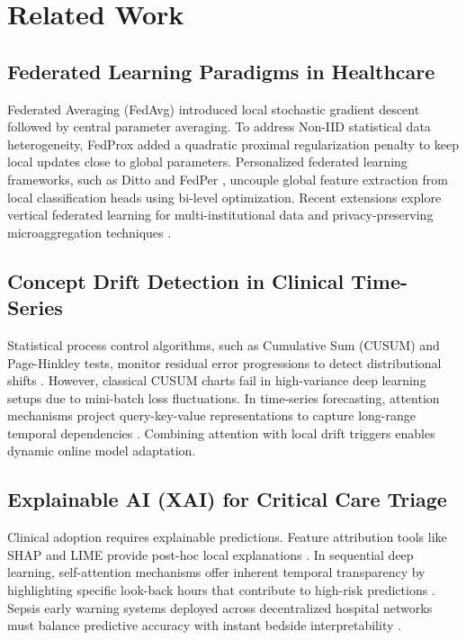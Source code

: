 \documentclass[conference]{IEEEtran}
\begin{document}
\section{Related Work}
\subsection{Federated Learning Paradigms in Healthcare}
Federated Averaging (FedAvg) \cite{mcmahan2017} introduced local stochastic gradient descent followed by central parameter averaging. To address Non-IID statistical data heterogeneity, FedProx \cite{li2020fedprox} added a quadratic proximal regularization penalty to keep local updates close to global parameters. Personalized federated learning frameworks, such as Ditto \cite{li2021ditto} and FedPer \cite{arivazhagan2020}, uncouple global feature extraction from local classification heads using bi-level optimization. Recent extensions explore vertical federated learning for multi-institutional data \cite{yang2025mvfl} and privacy-preserving microaggregation techniques \cite{gupta2025privacy, maurya2025secure}.

\subsection{Concept Drift Detection in Clinical Time-Series}
Statistical process control algorithms, such as Cumulative Sum (CUSUM) and Page-Hinkley tests, monitor residual error progressions to detect distributional shifts \cite{jothimurugesan2022}. However, classical CUSUM charts fail in high-variance deep learning setups due to mini-batch loss fluctuations. In time-series forecasting, attention mechanisms project query-key-value representations to capture long-range temporal dependencies \cite{larocca2021attention, tang2025horizon}. Combining attention with local drift triggers enables dynamic online model adaptation.

\subsection{Explainable AI (XAI) for Critical Care Triage}
Clinical adoption requires explainable predictions. Feature attribution tools like SHAP and LIME provide post-hoc local explanations \cite{larocca2022shap, kalakoti2025fedxai}. In sequential deep learning, self-attention mechanisms offer inherent temporal transparency by highlighting specific look-back hours that contribute to high-risk predictions \cite{lei2025supervised}. Sepsis early warning systems deployed across decentralized hospital networks must balance predictive accuracy with instant bedside interpretability \cite{qayyum2023fedsepsis, maher2025automl}.
\end{document}
